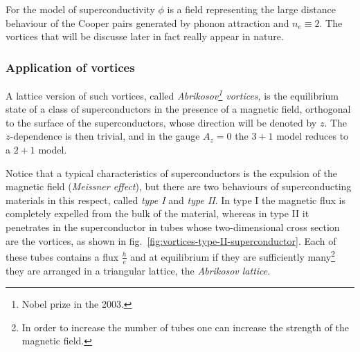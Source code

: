\documentclass[../main/main.tex]{subfiles}
\begin{document}
For the model of superconductivity $\phi$ is a field representing the large distance behaviour of the Cooper pairs generated by phonon attraction and $n_e\equiv2$. 
The vortices that will be discusse later in fact really appear in nature. 

\subsubsection{Application of vortices}

A lattice version of such vortices, called \emph{Abrikosov\footnote{Nobel prize in the 2003.} vortices}, is the equilibrium state of a class of superconductors in the presence of a magnetic field, orthogonal to the surface of the superconductors, whose direction will be denoted by $z$. The $z$-dependence is then trivial, and in the gauge $A_z=0$ the $3+1$ model reduces to a $2+1$ model. 

Notice that a typical characteristics of superconductors is the expulsion of the magnetic field (\emph{Meissner effect}), but there are two behaviours of superconducting materials in this respect, called \emph{type I} and \emph{type II}. In type I the magnetic flux is completely expelled from the bulk of the material, whereas in type II it penetrates in the superconductor in tubes whose two-dimensional cross section are the vortices, as shown in fig.~\ref{fig:vortices-type-II-superconductor}. Each of these tubes contains a flux $\frac he$ and at equilibrium if they are sufficiently many\footnote{In order to increase the number of tubes one can increase the strength of the magnetic field.} they are arranged in a triangular lattice, the \emph{Abrikosov lattice}. 
\end{document}
